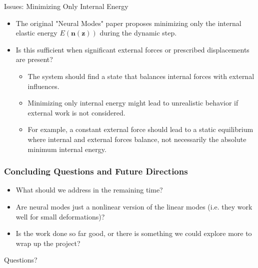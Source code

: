 \documentclass{beamer}
\begin{document}
\begin{frame}{Issues: Minimizing Only Internal Energy}
    \begin{itemize}
        \item The original "Neural Modes" paper proposes minimizing only the internal elastic energy \(E(\bm{n}(\bm{z}))\) during the dynamic step.
        \item Is this sufficient when significant external forces or prescribed displacements are present?
        \begin{itemize}
            \item The system should find a state that balances internal forces with external influences.
            \item Minimizing only internal energy might lead to unrealistic behavior if external work is not considered.
            \item For example, a constant external force should lead to a static equilibrium where internal and external forces balance, not necessarily the absolute minimum internal energy.
        \end{itemize}
    \end{itemize}
\end{frame}




\begin{frame}
    \frametitle{Concluding Questions and Future Directions}
    \begin{itemize}
        \item What should we address in the remaining time?
        \item Are neural modes just a nonlinear version of the linear modes (i.e. they work well for small deformations)?
        \item Is the work done so far good, or there is something we could explore more to wrap up the project?
    \end{itemize}
\end{frame}
\begin{frame}
    \begin{center}
        \color{blue} \Huge{Questions?}
    \end{center}

\end{frame}
\end{document}
